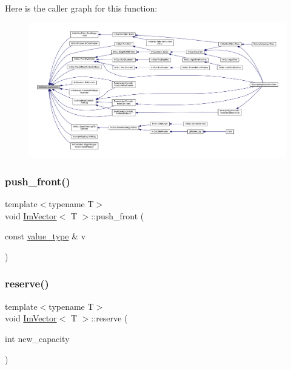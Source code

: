 Here is the caller graph for this function\+:
\nopagebreak
\begin{figure}[H]
\begin{center}
\leavevmode
\includegraphics[width=350pt]{class_im_vector_a68387993f2a5f5c3b2a7139d9ab778b8_icgraph}
\end{center}
\end{figure}
\mbox{\label{class_im_vector_a9a21cfec59d057cba605da14682180d2}} 
\subsubsection{\texorpdfstring{push\+\_\+front()}{push\_front()}}
{\footnotesize\ttfamily template$<$typename T$>$ \\
void \mbox{\hyperlink{class_im_vector}{Im\+Vector}}$<$ T $>$\+::push\+\_\+front (\begin{DoxyParamCaption}\item[{const \mbox{\hyperlink{class_im_vector_a8bd77e4e7581d8e5f9e98d7c2f3c2a80}{value\+\_\+type}} \&}]{v }\end{DoxyParamCaption})\hspace{0.3cm}{\ttfamily [inline]}}

\mbox{\label{class_im_vector_a0f14f5736c3372157856eebb67123b75}} 
\subsubsection{\texorpdfstring{reserve()}{reserve()}}
{\footnotesize\ttfamily template$<$typename T$>$ \\
void \mbox{\hyperlink{class_im_vector}{Im\+Vector}}$<$ T $>$\+::reserve (\begin{DoxyParamCaption}\item[{int}]{new\+\_\+capacity }\end{DoxyParamCaption})\hspace{0.3cm}{\ttfamily [inline]}}

